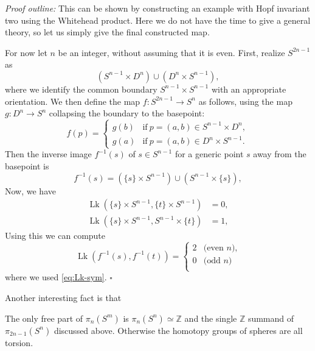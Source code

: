 \documentclass[12pt]{article}
\numberwithin{equation}{section}
\theoremstyle{remark}
\renewenvironment{proof}{\noindent\textsl{Proof outline:}}{\hfill$\square$}
\def\bZ{\mathbb{Z}}
\def\Lk{\mathop{\mathrm{Lk}}}
\begin{document}
\begin{proof}
This can be shown by constructing an example with Hopf invariant two using the Whitehead product.
Here we do not have the time to give a general theory, so let us simply give the final constructed map.

For now let $n$ be an integer, without assuming that it is even.
First, realize $S^{2n-1}$ as \begin{equation}
(S^{n-1} \times D^n) \cup (D^n \times S^{n-1}), 
\end{equation} where we identify the common boundary $S^{n-1}\times S^{n-1}$ with an appropriate orientation. 
We then define the map $f:S^{2n-1}\to S^n$ as follows,
using the map $g:D^n \to S^n$ collapsing the boundary to the basepoint:
\begin{equation}
f(p) = \begin{cases}
g(b) & \text{if}\ p=(a,b) \in S^{n-1}\times D^n ,\\
g(a) & \text{if}\ p=(a,b) \in D^{n}\times S^{n-1}.
\end{cases}
\end{equation}
Then the inverse image $f^{-1}(s)$ of $s\in S^{n-1}$ for a generic point $s$ away from the basepoint is  \begin{equation}
f^{-1}(s)= (\{s\} \times S^{n-1} ) \cup (S^{n-1} \times \{s\}),
\end{equation}
Now, we have \begin{align}
\Lk (\{s\} \times S^{n-1} ,\{t\} \times S^{n-1} )  &=0 ,\\
\Lk (\{s\} \times S^{n-1} ,S^{n-1}\times \{t\} )  &=1,
\end{align}
Using this we can compute \begin{equation}
\Lk (f^{-1}(s),f^{-1}(t)) = \begin{cases}
2 & \text{(even $n$),} \\
0 & \text{(odd $n$)} \\
\end{cases}
\end{equation}
where we used \eqref{eq:Lk-sym}.
\end{proof}



Another interesting fact is that 

\begin{theorem}
  The only free part of $\pi_n(S^m)$ is $\pi_n(S^n)\simeq \bZ$
  and the single $\bZ$ summand of $\pi_{2n-1}(S^n)$ discussed above.
  Otherwise the homotopy groups of spheres are all torsion.
\end{theorem}
  
\end{document}
